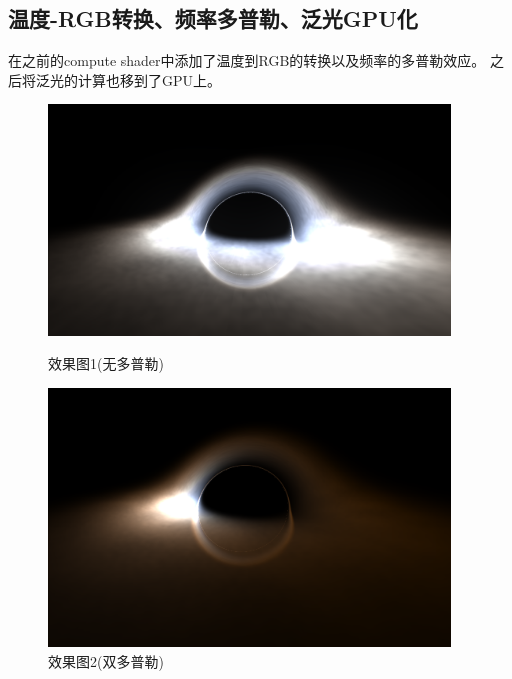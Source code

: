 \documentclass[a4paper, 12pt]{article}
\begin{document}
    \subsection{温度-RGB转换、频率多普勒、泛光GPU化}
    在之前的compute shader中添加了温度到RGB的转换以及频率的多普勒效应。
    之后将泛光的计算也移到了GPU上。
    \begin{figure}[H]
        \centering
        \begin{minipage}[t]{0.48\textwidth}
            \centering
            \includegraphics[width=0.95\textwidth]{photo/gb0.png}
            \caption{效果图1(无多普勒)}
        \end{minipage}
        \hfill
        \begin{minipage}[t]{0.48\textwidth}
            \centering
            \includegraphics[width=0.95\textwidth]{photo/gb1.png}
            \caption{效果图2(双多普勒)}
        \end{minipage}
        \hfill
        \begin{minipage}[t]{0.48\textwidth}
            \centering

\end{minipage}
\end{figure}
\end{document}
